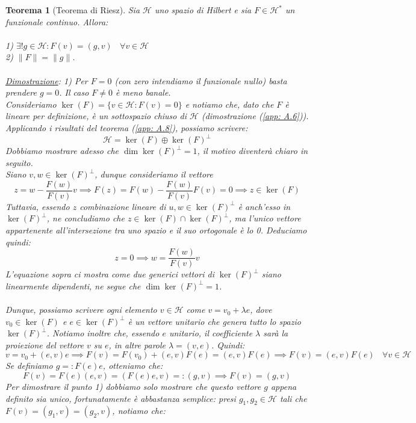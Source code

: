 \documentclass[a4paper,12pt]{report}
\newtheorem{teorema}{Teorema}[chapter]
\begin{document}
\begin{teorema}[Teorema di Riesz]\label{thm: 5.5}
    Sia $\mathscr{H}$ uno spazio di Hilbert e sia $F\in \mathscr{H}^*$ un funzionale continuo. Allora: 
    \\
    \\ 1) $\exists! g\in \mathscr{H}: F(v)=(g,v) \ \ \ \ \forall v\in \mathscr{H}$  
    \\ 2) $\|F\|=\|g\|$.
    \\
    \\\underline{Dimostrazione}: 1) Per $F=0$ (con zero intendiamo il funzionale nullo) basta prendere $g=0$. Il caso $F\neq 0$ è meno banale.
    \\Consideriamo $\ker(F)=\{v\in \mathscr{H}: F(v)=0\}$ e notiamo che, dato che $F$ è lineare per definizione, è un sottospazio chiuso di $\mathscr{H}$ (dimostrazione (\ref{app: A.6})). Applicando i risultati del teorema (\ref{app: A.8}), possiamo scrivere:
    \[\mathscr{H}=\ker(F)\oplus \ker(F)^{\perp}\]
    Dobbiamo mostrare adesso che $\dim\ker(F)^{\perp}=1$, il motivo diventerà chiaro in seguito. 
    \\ Siano $v,w\in \ker (F)^{\perp}$, dunque consideriamo il vettore 
    \[z=w-\displaystyle\frac{F(w)}{F(v)}v\implies F(z)=F(w)-\frac{F(w)}{F(v)}F(v)=0\implies z\in \ker(F)\]
    Tuttavia, essendo $z$ combinazione lineare di $u,w\in \ker(F)^{\perp}$ è anch'esso in $\ker(F)^{\perp}$, ne concludiamo che $z\in \ker(F)\cap\ker(F)^{\perp}$, ma l'unico vettore appartenente all'intersezione tra uno spazio e il suo ortogonale è lo 0. Deduciamo quindi:
    \[z=0\implies w=\frac{F(w)}{F(v)}v\]
    L'equazione sopra ci mostra come due generici vettori di $\ker(F)^{\perp}$ siano linearmente dipendenti, ne segue che $\dim\ker(F)^{\perp}=1$.
    \\
    \\ Dunque, possiamo scrivere ogni elemento $v\in \mathscr{H}$ come $v=v_0+\lambda e$, dove $v_0\in \ker(F)$ e $e\in \ker(F)^{\perp}$ è un vettore unitario che genera tutto lo spazio $\ker(F)^{\perp}$. Notiamo inoltre che, essendo $e$ unitario, il coefficiente $\lambda$ sarà la proiezione del vettore $v$ su $e$, in altre parole $\lambda=(v,e)$. Quindi:
    \[v=v_0+(e,v)e\implies F(v)=F(v_0)+(e,v)F(e)=(e,v)F(e)\implies F(v)=(e,v)F(e) \  \ \ \ \forall v\in \mathscr{H}\]
    Se definiamo $g=:F(e)e$, otteniamo che:
    \[F(v)=F(e)(e,v)=(F(e)e,v)=:(g,v)\implies F(v)=(g,v)\]
    Per dimostrare il punto 1) dobbiamo solo mostrare che questo vettore $g$ appena definito sia unico, fortunatamente è abbastanza semplice: presi $g_1,g_2\in \mathscr{H}$ tali che $F(v)=(g_1,v)=(g_2,v)$, notiamo che:

\end{teorema}
\end{document}
